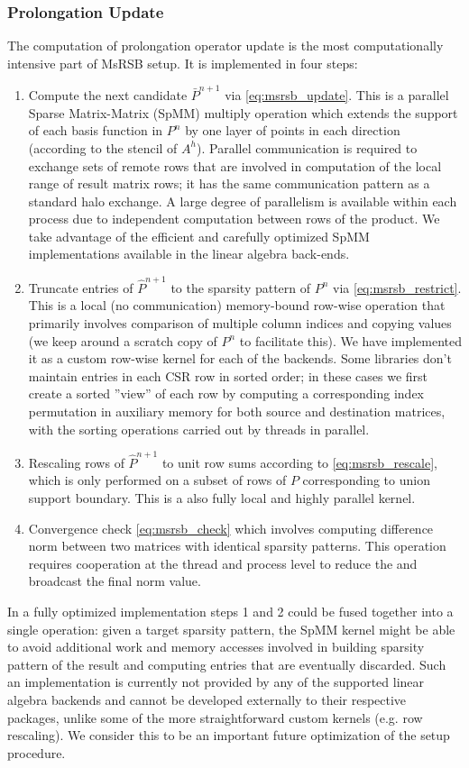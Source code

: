\subsubsection{Prolongation Update}
\label{subsubsec:par_kernels_msrsb_update}

The computation of prolongation operator update is the most computationally intensive part of MsRSB setup.   It is implemented in four steps:
\begin{enumerate}
    \item Compute the next candidate $\bar{P}^{n+1}$ via \cref{eq:msrsb_update}.   This is a parallel Sparse Matrix-Matrix (SpMM) multiply operation which extends the support of each basis function in $P^n$ by one layer of points in each direction (according to the stencil of $A^h$).   Parallel communication is required to exchange sets of remote rows that are involved in computation of the local range of result matrix rows; it has the same communication pattern as a standard halo exchange.   A large degree of parallelism is available within each process due to independent computation between rows of the product.   We take advantage of the efficient and carefully optimized SpMM implementations available in the linear algebra back-ends.
    \item Truncate entries of $\hat{P}^{n+1}$ to the sparsity pattern of $P^n$ via \cref{eq:msrsb_restrict}.   This is a local (no communication) memory-bound row-wise operation that primarily involves comparison of multiple column indices and copying values (we keep around a scratch copy of $P^n$ to facilitate this).   We have implemented it as a custom row-wise kernel for each of the backends.   Some libraries don't maintain entries in each CSR row in sorted order; in these cases we first create a sorted ''view'' of each row by computing a corresponding index permutation in auxiliary memory for both source and destination matrices, with the sorting operations carried out by threads in parallel.
    \item Rescaling rows of $\hat{P}^{n+1}$ to unit row sums according to \cref{eq:msrsb_rescale}, which is only performed on a subset of rows of $P$ corresponding to union support boundary.   This is a also fully local and highly parallel kernel.
    \item Convergence check \cref{eq:msrsb_check} which involves computing difference norm between two matrices with identical sparsity patterns.   This operation requires cooperation at the thread and process level to reduce the and broadcast the final norm value.
\end{enumerate}
In a fully optimized implementation steps 1 and 2 could be fused together into a single operation: given a target sparsity pattern, the SpMM kernel might be able to avoid additional work and memory accesses involved in building sparsity pattern of the result and computing entries that are eventually discarded.   Such an implementation is currently not provided by any of the supported linear algebra backends and cannot be developed externally to their respective packages, unlike some of the more straightforward custom kernels (e.g. row rescaling).   We consider this to be an important future optimization of the setup procedure.


